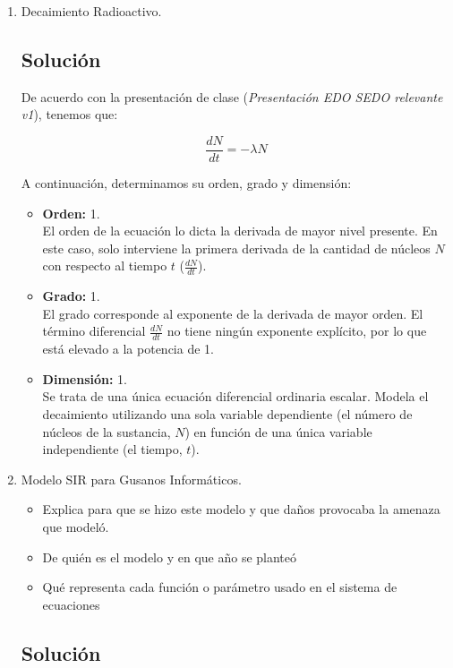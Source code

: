 \begin{enumerate}[label=\arabic*., leftmargin=*]
    \item Decaimiento Radioactivo.
    
    \subsection{Solución}

    De acuerdo con la presentación de clase (\textit{Presentación EDO SEDO relevante v1}), tenemos que:

    \[ \frac{dN}{dt} = -\lambda N \]

    A continuación, determinamos su orden, grado y dimensión:

    \begin{itemize}[leftmargin=*]
        \item \textbf{Orden:} 1.\\
        El orden de la ecuación lo dicta la derivada de mayor nivel presente. En este caso, solo interviene la primera derivada de la cantidad de núcleos $N$ con respecto al tiempo $t$ ($\frac{dN}{dt}$). 

        \item \textbf{Grado:} 1.\\
        El grado corresponde al exponente de la derivada de mayor orden. El término diferencial $\frac{dN}{dt}$ no tiene ningún exponente explícito, por lo que está elevado a la potencia de 1.

        \item \textbf{Dimensión:} 1.\\
        Se trata de una única ecuación diferencial ordinaria escalar. Modela el decaimiento utilizando una sola variable dependiente (el número de núcleos de la sustancia, $N$) en función de una única variable independiente (el tiempo, $t$).
    \end{itemize}
    
    \item Modelo SIR para Gusanos Informáticos.
    \begin{itemize}[leftmargin=*]
        \item Explica para que se hizo este modelo y que daños provocaba la amenaza que modeló.
        \item De quién es el modelo y en que año se planteó
        \item Qué representa cada función o parámetro usado en el sistema de ecuaciones
    \end{itemize}
    
    \subsection{Solución}


\end{enumerate}

